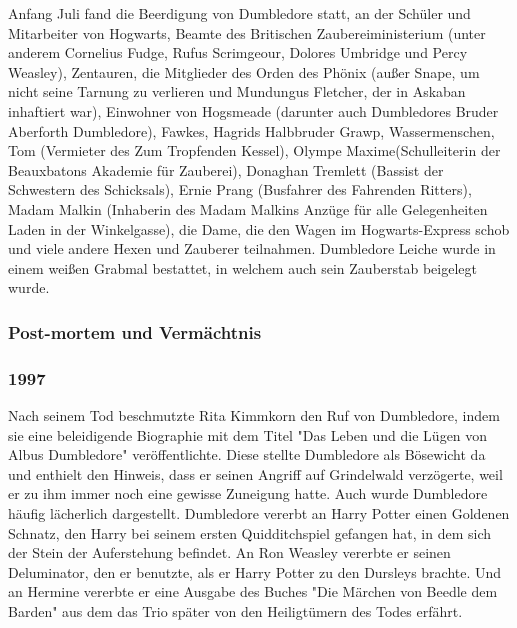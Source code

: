 \documentclass[a4paper, 10pt]{article}
\begin{document}
\vspace{10pt}
\newline
{}  
Anfang Juli fand die Beerdigung von Dumbledore statt, an der Schüler und Mitarbeiter von Hogwarts, Beamte des Britischen Zaubereiministerium (unter anderem Cornelius Fudge, Rufus Scrimgeour, Dolores Umbridge und Percy Weasley), Zentauren, die Mitglieder des Orden des Phönix (außer Snape, um nicht seine Tarnung zu verlieren und Mundungus Fletcher, der in Askaban inhaftiert war), Einwohner von Hogsmeade (darunter auch Dumbledores Bruder Aberforth Dumbledore), Fawkes, Hagrids Halbbruder Grawp, Wassermenschen, Tom (Vermieter des Zum Tropfenden Kessel), Olympe Maxime(Schulleiterin der Beauxbatons Akademie für Zauberei), Donaghan Tremlett (Bassist der Schwestern des Schicksals), Ernie Prang (Busfahrer des Fahrenden Ritters), Madam Malkin (Inhaberin des Madam Malkins Anzüge für alle Gelegenheiten Laden in der Winkelgasse), die Dame, die den Wagen im Hogwarts-Express schob und viele andere Hexen und Zauberer teilnahmen. Dumbledore Leiche wurde in einem weißen Grabmal bestattet, in welchem auch sein Zauberstab beigelegt wurde.

\subsubsection*{Post-mortem und Vermächtnis}
\subsubsection*{1997}
Nach seinem Tod beschmutzte Rita Kimmkorn den Ruf von Dumbledore, indem sie eine beleidigende Biographie mit dem Titel "Das Leben und die Lügen von Albus Dumbledore" veröffentlichte. Diese stellte Dumbledore als Bösewicht da und enthielt den Hinweis, dass er seinen Angriff auf Grindelwald verzögerte, weil er zu ihm immer noch eine gewisse Zuneigung hatte. Auch wurde Dumbledore häufig lächerlich dargestellt.
\vspace{10pt}
\newline
{}  
Dumbledore vererbt an Harry Potter einen Goldenen Schnatz, den Harry bei seinem ersten Quidditchspiel gefangen hat, in dem sich der Stein der Auferstehung befindet. An Ron Weasley vererbte er seinen Deluminator, den er benutzte, als er Harry Potter zu den Dursleys brachte. Und an Hermine vererbte er eine Ausgabe des Buches "Die Märchen von Beedle dem Barden" aus dem das Trio später von den Heiligtümern des Todes erfährt.
\end{document}
